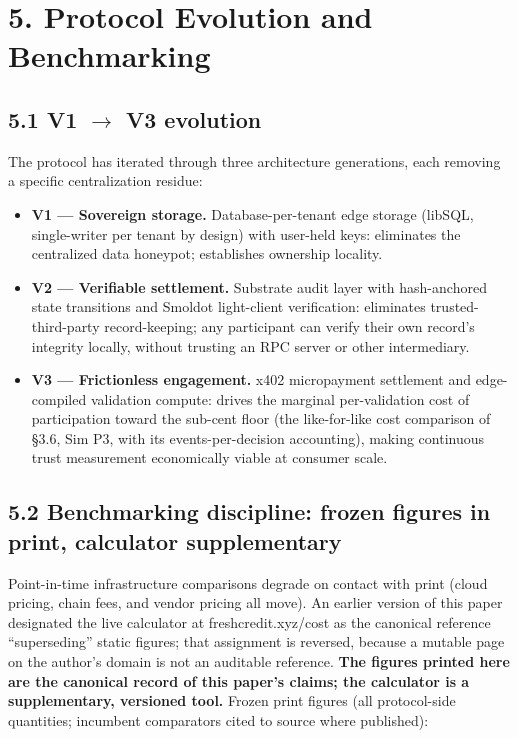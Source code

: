 \documentclass[
]{article}
\begin{document}
\section{5. Protocol Evolution and
Benchmarking}\label{protocol-evolution-and-benchmarking}

\subsection{\texorpdfstring{5.1 V1 \(\to\) V3
evolution}{5.1 V1 \textbackslash to V3 evolution}}\label{v1-to-v3-evolution}

The protocol has iterated through three architecture generations, each
removing a specific centralization residue:

\begin{itemize}
\item
  \textbf{V1 --- Sovereign storage.} Database-per-tenant edge storage
  (libSQL, single-writer per tenant by design) with user-held keys:
  eliminates the centralized data honeypot; establishes ownership
  locality.
\item
  \textbf{V2 --- Verifiable settlement.} Substrate audit layer with
  hash-anchored state transitions and Smoldot light-client verification:
  eliminates trusted-third-party record-keeping; any participant can
  verify their own record's integrity locally, without trusting an RPC
  server or other intermediary.
\item
  \textbf{V3 --- Frictionless engagement.} x402 micropayment settlement
  and edge-compiled validation compute: drives the marginal
  per-validation cost of participation toward the sub-cent floor (the
  like-for-like cost comparison of §3.6, Sim P3, with its
  events-per-decision accounting), making continuous trust measurement
  economically viable at consumer scale.
\end{itemize}

\subsection{5.2 Benchmarking discipline: frozen figures in print,
calculator
supplementary}\label{benchmarking-discipline-frozen-figures-in-print-calculator-supplementary}

Point-in-time infrastructure comparisons degrade on contact with print
(cloud pricing, chain fees, and vendor pricing all move). An earlier
version of this paper designated the live calculator at
freshcredit.xyz/cost as the canonical reference ``superseding'' static
figures; that assignment is reversed, because a mutable page on the
author's domain is not an auditable reference. \textbf{The figures
printed here are the canonical record of this paper's claims; the
calculator is a supplementary, versioned tool.} Frozen print figures
(all protocol-side quantities; incumbent comparators cited to source
where published):
\end{document}
